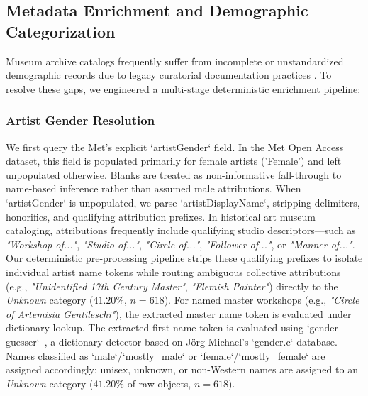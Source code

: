 \documentclass[pdflatex,sn-mathphys-num]{sn-jnl}%
\theoremstyle{thmstyleone}%
\theoremstyle{thmstyletwo}%
\theoremstyle{thmstylethree}%
\begin{document}
\subsection{Metadata Enrichment and Demographic Categorization}
Museum archive catalogs frequently suffer from incomplete or unstandardized demographic records due to legacy curatorial documentation practices \cite{carlson2022museum, garcia2020bias, bailey2020gender}. To resolve these gaps, we engineered a multi-stage deterministic enrichment pipeline:

\subsubsection{Artist Gender Resolution}
We first query the Met's explicit `artistGender` field. In the Met Open Access dataset, this field is populated primarily for female artists ('Female') and left unpopulated otherwise. Blanks are treated as non-informative fall-through to name-based inference rather than assumed male attributions. When `artistGender` is unpopulated, we parse `artistDisplayName`, stripping delimiters, honorifics, and qualifying attribution prefixes. In historical art museum cataloging, attributions frequently include qualifying studio descriptors—such as \textit{"Workshop of..."}, \textit{"Studio of..."}, \textit{"Circle of..."}, \textit{"Follower of..."}, or \textit{"Manner of..."}. Our deterministic pre-processing pipeline strips these qualifying prefixes to isolate individual artist name tokens while routing ambiguous collective attributions (e.g., \textit{"Unidentified 17th Century Master"}, \textit{"Flemish Painter"}) directly to the \textit{Unknown} category ($41.20\%$, $n=618$). For named master workshops (e.g., \textit{"Circle of Artemisia Gentileschi"}), the extracted master name token is evaluated under dictionary lookup. The extracted first name token is evaluated using `gender-guesser`~\cite{gender_guesser}, a dictionary detector based on J{\"o}rg Michael's `gender.c` database. Names classified as `male`/`mostly\_male` or `female`/`mostly\_female` are assigned accordingly; unisex, unknown, or non-Western names are assigned to an \textit{Unknown} category ($41.20\%$ of raw objects, $n=618$). 
\end{document}
